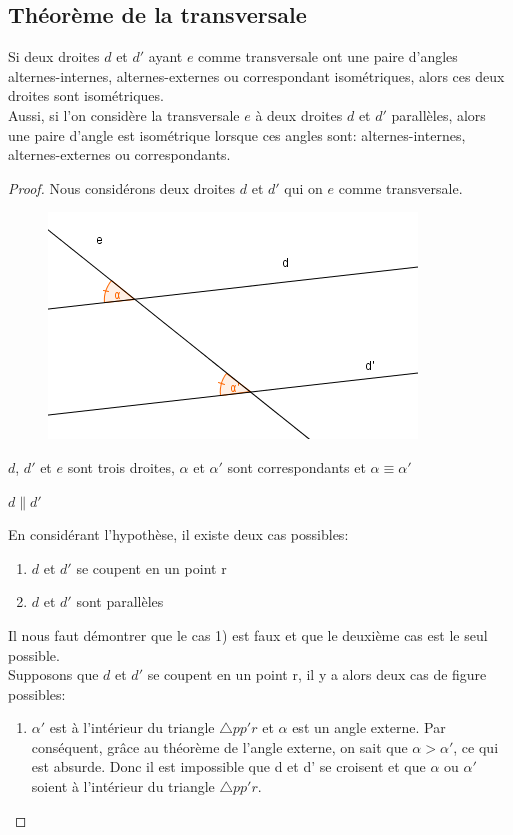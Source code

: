 \documentclass[a4paper,12pt]{article}
\begin{document}
\pagebreak
\subsection{Théorème de la transversale}
\begin{theorem}\label{th:transversale}
Si deux droites $d$ et $d'$ ayant $e$ comme transversale ont une paire d'angles alternes-internes, alternes-externes ou correspondant isométriques, alors ces deux droites sont isométriques.\\
Aussi, si l'on considère la transversale $e$ à deux droites $d$ et $d'$ parallèles, alors une paire d'angle est isométrique lorsque ces angles sont: alternes-internes, alternes-externes ou  correspondants.
\end{theorem}
\begin{proof}
Nous considérons deux droites $d$ et $d'$ qui on $e$ comme transversale.
\begin{figure}[H]
    \centering
    \includegraphics[scale=1]{theorems/transversal/Transversale.PNG}
\end{figure}


\begin{hyp}
     $d$, $d'$ et $e$ sont trois droites,
     $\alpha$ et $\alpha'$ sont correspondants et
     $\alpha \equiv \alpha'$
 \end{hyp}
 \begin{concl}
     $d \parallel d'$
 \end{concl}
 En considérant l'hypothèse, il existe deux cas possibles:
 \begin{enumerate}
     \item $d$ et $d'$ se coupent en un point r
     \item $d$ et $d'$ sont parallèles
 \end{enumerate}
 Il nous faut démontrer que le cas 1) est faux et que le deuxième cas est le seul possible.\\
 Supposons que $d$ et $d'$ se coupent en un point r, il y a alors deux cas de figure possibles:
 \begin{enumerate}[label=\emph{\alph*}.]
  \item $\alpha'$ est à l'intérieur du triangle $\triangle pp'r$ et $\alpha$ est un angle externe. Par conséquent, grâce au théorème de l'angle externe, on sait que $\alpha>\alpha'$, ce qui est absurde. Donc il est impossible que d et d' se croisent et que $\alpha$ ou $\alpha'$ soient à l'intérieur du triangle $\triangle pp'r$.
  

\end{enumerate}
\end{proof}
\end{document}
